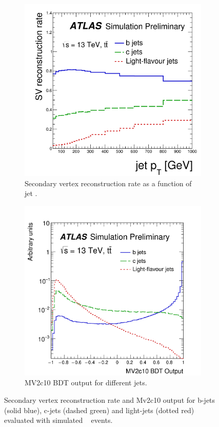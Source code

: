 \begin{figure}[h!]
\centering
\captionsetup{justification=centering}
    \begin{subfigure}[b]{0.4\textwidth}
        \includegraphics[width=\textwidth]{figures/object/b_sv}
        \caption{Secondary vertex reconstruction rate as a function of jet \pt.}
        \label{fig:obj_b_sv}
    \end{subfigure}
    \quad
    \begin{subfigure}[b]{0.45\textwidth}
        \includegraphics[width=\textwidth]{figures/object/b_mv2}
        \caption{MV2c10 BDT output for different jets.}
        \label{fig:obj_b_mv2}
    \end{subfigure}
\caption{Secondary vertex reconstruction rate and Mv2c10 output for b-jets (solid blue), c-jets (dashed green) and light-jets (dotted red) evaluated with simulated \ttbar~ events.}
\label{fig:obj_btag}
\end{figure}


